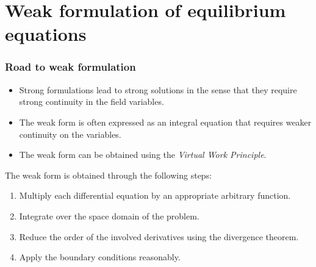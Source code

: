 \documentclass[aspectratio=169]{beamer}
\begin{document}
\section{Weak formulation of equilibrium equations}

\begin{frame}
  \frametitle{Road to weak formulation}
  \begin{itemize}
    \item Strong formulations lead to strong solutions in the sense that they require strong continuity in the field variables.
    \item The weak form is often expressed as an integral equation that requires weaker continuity on the variables.
    \item The weak form can be obtained using the \emph{Virtual Work Principle}.
  \end{itemize}
  \vspace{-3pt}\noindent{\color{darkred}\rule{\linewidth}{0.1mm}\vspace{3pt}}

  The weak form is obtained through the following steps:
  \begin{enumerate}
    \item Multiply each differential equation by an appropriate arbitrary function.
    \item Integrate over the space domain of the problem.
    \item Reduce the order of the involved derivatives using the divergence theorem.
    \item Apply the boundary conditions reasonably.
  \end{enumerate}
\end{frame}
\end{document}
